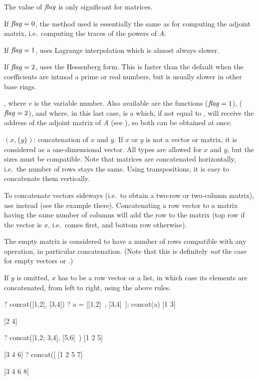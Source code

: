 The value of $\hbox{\it f\kern0pt lag\/}$ is only significant for matrices.

If $\hbox{\it f\kern0pt lag\/}=0$, the method used is essentially the same as for computing the
adjoint matrix, i.e.~computing the traces of the powers of $A$.

If $\hbox{\it f\kern0pt lag\/}=1$, uses Lagrange interpolation which is almost always slower.

If $\hbox{\it f\kern0pt lag\/}=2$, uses the Hessenberg form. This is faster than the default when
the coefficients are intmod a prime or real numbers, but is usually
slower in other base rings.

, where $v$ is the variable number. Also available
are the functions  ($\hbox{\it f\kern0pt lag\/}=1$), 
($\hbox{\it f\kern0pt lag\/}=2$), and  where, in this last case,
 is a  which, if not equal to , will receive
the address of the adjoint matrix of $A$ (see ), so both
can be obtained at once.

$(x,\{y\})$: concatenation of $x$ and $y$. If $x$ or $y$ is
not a vector or matrix, it is considered as a one-dimensional vector. All
types are allowed for $x$ and $y$, but the sizes must be compatible. Note
that matrices are concatenated horizontally, i.e.~the number of rows stays
the same. Using transpositions, it is easy to concatenate them vertically.

To concatenate vectors sideways (i.e.~to obtain a two-row or two-column
matrix), use  instead (see the example there). Concatenating a row
vector to a matrix having the same number of columns will add the row to the
matrix (top row if the vector is $x$, i.e.~comes first, and bottom row
otherwise).

The empty matrix \kbd{[;]} is considered to have a number of rows compatible
with any operation, in particular concatenation. (Note that this is
definitely \emph{not} the case for empty vectors \kbd{[~]} or \kbd{[~]\til}.)

If $y$ is omitted, $x$ has to be a row vector or a list, in which case its
elements are concatenated, from left to right, using the above rules.

\bprog
? concat([1,2], [3,4])
? a = [[1,2]~, [3,4]~]; concat(a)
[1 3]

[2 4]

? concat([1,2; 3,4], [5,6]~)
[1 2 5]

[3 4 6]
? concat([%
[1 2 5 7]

[3 4 6 8]

